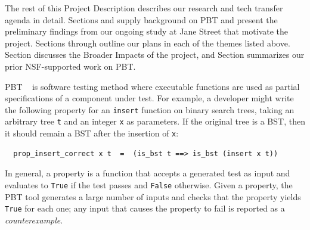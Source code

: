 \medskip

The rest of this Project Description describes our research and
tech transfer agenda in detail.  Sections
 and  supply
background on PBT and present the preliminary findings from our
ongoing study at Jane Street that motivate the project.
%
Sections  through
 outline our plans in each of the
themes listed above.
Section 
discusses the Broader Impacts of the project, and
Section  summarizes our prior
NSF-supported work on PBT.

\iflater
{}
\fi

\iflater
{}
\fi



%
PBT%
~\cite{hughes2007quickcheck}
is software testing method where
executable functions are used as partial
specifications of a component under test. For example, a developer might
write the following property for an \lstinline{insert}
function on binary search trees, taking an arbitrary tree \texttt{t}
and an integer
\texttt{x} as parameters. If the original tree
is a BST, then it should remain
a BST after the insertion of \texttt{x}:
\begin{lstlisting}
  prop_insert_correct x t  =  (is_bst t ==> is_bst (insert x t))
\end{lstlisting}
In general, a property is a function that
accepts a generated
test as input \iflater{}\fi
and evaluates to \lstinline{True} if the test passes and
\lstinline{False} otherwise.
Given a property, the PBT tool generates a
large number of inputs and
checks that the property yields \lstinline{True} for each one; any input
that causes the property to fail is reported as a {\em counterexample}.

